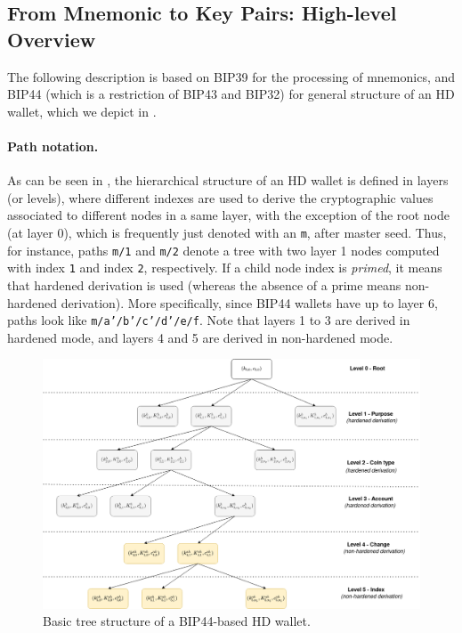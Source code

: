 \subsection{From Mnemonic to Key Pairs: High-level Overview}

The following description is based on BIP39 for the processing of mnemonics,
and BIP44 (which is a restriction of BIP43 and BIP32) for general structure of
an HD wallet, which we depict in .

\paragraph{Path notation.} As can be seen in , the
hierarchical structure of an HD wallet is defined in layers (or levels), where
different indexes are used to derive the cryptographic values associated to
different nodes in a same layer, with the exception of the root node (at layer
0), which is frequently just denoted with an \texttt{m}, after master seed.
Thus, for instance, paths  \texttt{m/1} and \texttt{m/2} denote a tree with two
layer 1 nodes computed with index \texttt{1} and index \texttt{2},
respectively. If a child node index is \emph{primed}, it means that hardened
derivation is used (whereas the absence of a prime means non-hardened
derivation). More specifically, since BIP44 wallets have up to layer 6, paths
look like \texttt{m/a'/b'/c'/d'/e/f}. Note that layers 1 to 3 are derived in
hardened mode, and layers 4 and 5 are derived in non-hardened mode.

\begin{figure}[ht!]
  \includegraphics[width=\textwidth]{figures/bip44_tree.png}
  \caption{Basic tree structure of a BIP44-based HD wallet.}
  \label{fig:bip44-tree}
\end{figure}


